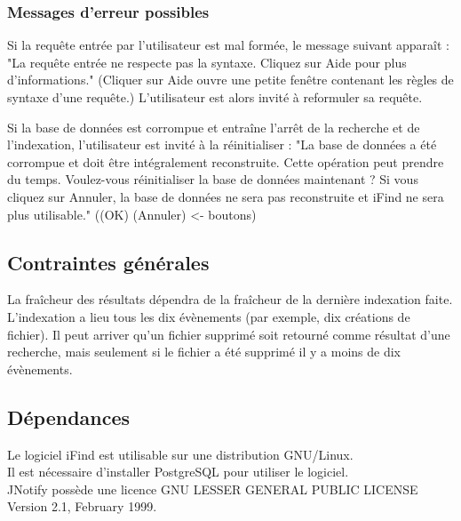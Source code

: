 

\subsubsection{Messages d'erreur possibles}
Si la requête entrée par l'utilisateur est mal formée, le message suivant apparaît :
"La requête entrée ne respecte pas la syntaxe. Cliquez sur Aide pour plus d'informations."
(Cliquer sur Aide ouvre une petite fenêtre contenant les règles de syntaxe d'une requête.)
L'utilisateur est alors invité à reformuler sa requête.

Si la base de données est corrompue et entraîne l'arrêt de la recherche et de l'indexation, l'utilisateur est invité à la réinitialiser :
"La base de données a été corrompue et doit être intégralement reconstruite. 
Cette opération peut prendre du temps. Voulez-vous réinitialiser la base de données maintenant ?
Si vous cliquez sur Annuler, la base de données ne sera pas reconstruite et iFind ne sera plus utilisable."
((OK) (Annuler) <- boutons)

\subsection{Contraintes générales}
La fraîcheur des résultats dépendra de la fraîcheur de la dernière indexation faite.\\
L'indexation a lieu tous les dix évènements (par exemple, dix créations de fichier).
Il peut arriver qu'un fichier supprimé soit retourné comme résultat d'une recherche, 
mais seulement si le fichier a été supprimé il y a moins de dix évènements.

\subsection{Dépendances}
Le logiciel iFind est utilisable sur une distribution GNU/Linux.\\
Il est nécessaire d'installer PostgreSQL pour utiliser le logiciel.\\
JNotify possède une licence GNU LESSER GENERAL PUBLIC LICENSE Version 2.1, February 1999.
\newpage



\newpage
